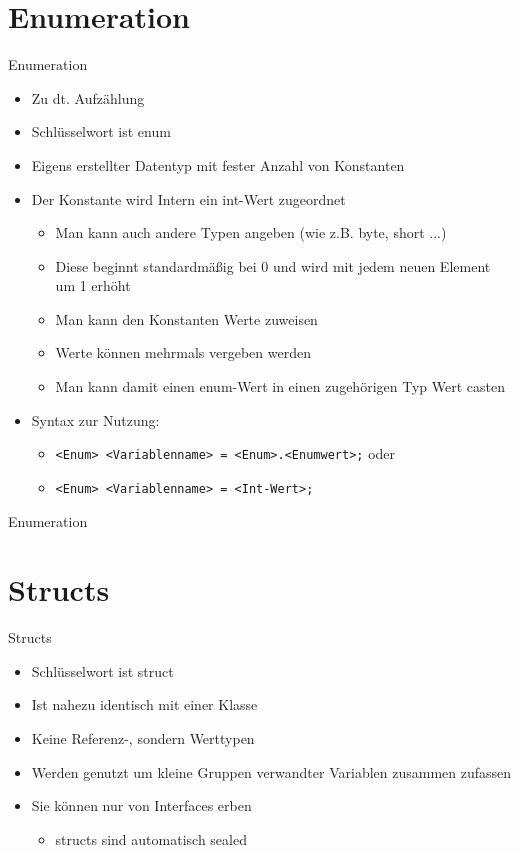 \section{Enumeration}
\begin{frame}{Enumeration}
	\begin{itemize}
		\item Zu dt. Aufzählung
		\item Schlüsselwort ist \alert{enum}
		\item Eigens erstellter Datentyp mit fester Anzahl von Konstanten
		\item Der Konstante wird Intern ein \alert{int}-Wert zugeordnet
		\begin{itemize}
			\item Man kann auch andere Typen angeben (wie z.B. \alert{byte}, \alert{short} ...)
			\item Diese beginnt standardmäßig bei 0 und wird mit jedem neuen Element um 1 erhöht
			\item Man kann den Konstanten Werte zuweisen
			\item Werte können mehrmals vergeben werden
			\item Man kann damit einen \alert{enum}-Wert in einen zugehörigen Typ Wert casten			
		\end{itemize}
		\item Syntax zur Nutzung:
		\begin{itemize}
			\item \texttt{\alert{<Enum> <Variablenname>} = \alert{<Enum>}.\alert{<Enumwert>};} oder
			\item \texttt{\alert{<Enum> <Variablenname>} = \alert{<Int-Wert>};}
		\end{itemize}
	\end{itemize}
\end{frame}

\begin{frame}{Enumeration}
	
	
\end{frame}

\section{Structs}
\begin{frame}{Structs}
	\begin{itemize}
		\item Schlüsselwort ist \alert{struct}
		\item Ist nahezu identisch mit einer Klasse
		\item Keine Referenz-, sondern Werttypen
		\item Werden genutzt um kleine Gruppen verwandter Variablen zusammen zufassen
		\item Sie können nur von Interfaces erben 
		\begin{itemize}
			\item \alert{struct}s sind automatisch \alert{sealed}
		\end{itemize}
	\end{itemize}
\end{frame}

